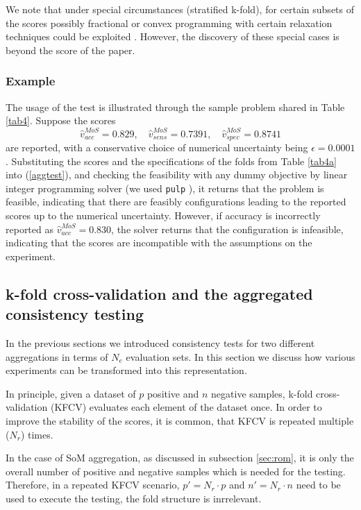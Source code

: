 \documentclass[5p, final]{elsarticle}
\begin{document}
We note that under special circumstances (stratified k-fold), for certain subsets of the scores possibly fractional or convex programming with certain relaxation techniques could be exploited \cite{nonlinear}. However, the discovery of these special cases is beyond the score of the paper.

\subsubsection{Example}

The usage of the test is illustrated through the sample problem shared in Table \ref{tab4}. Suppose the scores
\begin{equation}
\hat{v}_{acc}^{MoS} = 0.829, \quad
\hat{v}_{sens}^{MoS} = 0.7391, \quad
\hat{v}_{spec}^{MoS} = 0.8741
\end{equation}
are reported, with a conservative choice of numerical uncertainty being $\epsilon=0.0001$. Substituting the scores and the specifications of the folds from Table \ref{tab4a} into (\ref{aggtest}), and checking the feasibility with any dummy objective by linear integer programming solver (we used \verb|pulp| \cite{pulp}), it returns that the problem is feasible, indicating that there are feasibly configurations leading to the reported scores up to the numerical uncertainty. However, if accuracy is incorrectly reported as $\hat{v}_{acc}^{MoS} = 0.830$, the solver returns that the configuration is infeasible, indicating that the scores are incompatible with the assumptions on the experiment.

\subsection{k-fold cross-validation and the aggregated consistency testing}
\label{sec:kfold}

In the previous sections we introduced consistency tests for two different aggregations in terms of $N_e$ evaluation sets. In this section we discuss how various experiments can be transformed into this representation.

In principle, given a dataset of $p$ positive and $n$ negative samples, k-fold cross-validation (KFCV) evaluates each element of the dataset once. In order to improve the stability of the scores, it is common, that KFCV is repeated multiple ($N_r$) times.

In the case of SoM aggregation, as discussed in subsection \ref{sec:rom}, it is only the overall number of positive and negative samples which is needed for the testing. Therefore, in a repeated KFCV scenario, $p'=N_r\cdot p$ and $n'=N_r\cdot n$ need to be used to execute the testing, the fold structure is inrrelevant.
\end{document}
